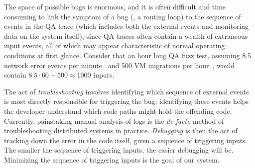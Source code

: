 The space of possible bugs is enormous, and it is often difficult and time
consuming to link the
symptom of a bug (\eg, a routing loop) to the sequence of events in the QA
trace (which includes both the external events and monitoring data on the
system itself), since QA traces often contain a wealth
of extraneous input events, all of which may appear characteristic of normal
operating conditions at first glance. Consider that an hour long QA fuzz test, assuming 8.5 network error events per
minute~\cite{Greenberg:2009:VSF:1592568.1592576} and 500 VM migrations per
hour~\cite{Soundararajan:2010:CBS:1899928.1899941},
would contain $8.5 \cdot 60 + 500 \approx 1000$ inputs.

The act of {\em troubleshooting} involves identifying which sequence of external events is most directly responsible for triggering the bug; identifying these events helps the developer understand which code paths might hold the offending code. Currently, painstaking manual analysis of logs is the {\em de facto} method of troubleshooting distributed systems in practice.
{\em Debugging} is then the act of tracking down the error in the code itself,
given a sequence
of triggering inputs. The smaller the sequence of triggering inputs, the easier debugging will
be. Minimizing the sequence of triggering inputs is the goal of our system.

